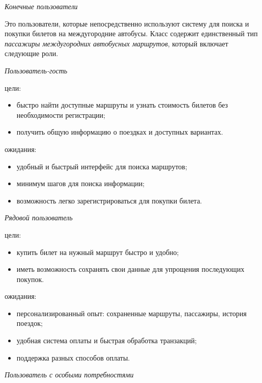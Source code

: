 \begin{center}
    \textit{Конечные пользователи}
\end{center}

Это пользователи, которые непосредственно используют систему для поиска и
покупки билетов на междугородние автобусы. Класс содержит единственный тип
\textit{пассажиры междугородних автобусных маршрутов}, который включает
следующие роли.

\null

\noindent\textit{Пользователь-гость}

\noindent цели:
\begin{itemize}
    \item быстро найти доступные маршруты и узнать стоимость билетов без
    необходимости регистрации;
    \item получить общую информацию о поездках и доступных вариантах.
\end{itemize}

\noindent ожидания:
\begin{itemize}
    \item удобный и быстрый интерфейс для поиска маршрутов;
    \item минимум шагов для поиска информации;
    \item возможность легко зарегистрироваться для покупки билета.
\end{itemize}

\null

\noindent\textit{Рядовой пользователь}

\noindent цели:
\begin{itemize}
    \item купить билет на нужный маршрут быстро и удобно;
    \item иметь возможность сохранять свои данные для упрощения
    последующих покупок.
\end{itemize}

\noindent ожидания:
\begin{itemize}
    \item персонализированный опыт: сохраненные маршруты, пассажиры,
    история поездок;
    \item удобная система оплаты и быстрая обработка транзакций;
    \item поддержка разных способов оплаты.
\end{itemize}

\null

\noindent\textit{Пользователь с особыми потребностями}

